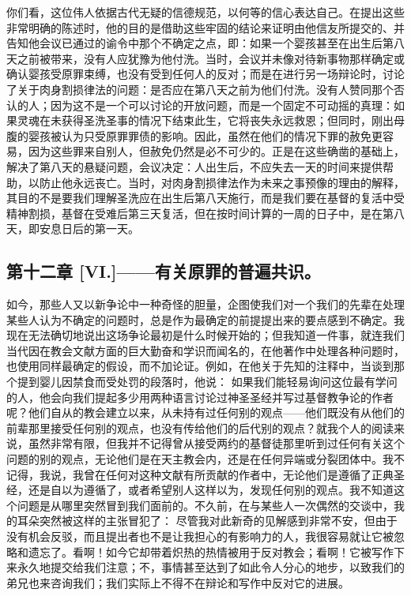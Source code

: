 你们看，这位伟人依据古代无疑的信德规范，以何等的信心表达自己。在提出这些非常明确的陈述时，他的目的是借助这些牢固的结论来证明由他信友所提交的、并告知他会议已通过的谕令中那个不确定之点，即：如果一个婴孩甚至在出生后第八天之前被带来，没有人应犹豫为他付洗。当时，会议并未像对待新事物那样确定或确认婴孩受原罪束缚，也没有受到任何人的反对；而是在进行另一场辩论时，讨论了关于肉身割损律法的问题：是否应在第八天之前为他们付洗。没有人赞同那个否认的人；因为这不是一个可以讨论的开放问题，而是一个固定不可动摇的真理：如果灵魂在未获得圣洗圣事的情况下结束此生，它将丧失永远救恩；但同时，刚出母腹的婴孩被认为只受原罪罪债的影响。因此，虽然在他们的情况下罪的赦免更容易，因为这些罪来自别人，但赦免仍然是必不可少的。正是在这些确凿的基础上，解决了第八天的悬疑问题，会议决定：人出生后，不应失去一天的时间来提供帮助，以防止他永远丧亡。当时，对肉身割损律法作为未来之事预像的理由的解释，其目的不是要我们理解圣洗应在出生后第八天施行，而是我们要在基督的复活中受精神割损，基督在受难后第三天复活，但在按时间计算的一周的日子中，是在第八天，即安息日后的第一天。\par


\subsection{第十二章 [VI.]——有关原罪的普遍共识。}

如今，那些人又以新争论中一种奇怪的胆量，企图使我们对一个我们的先辈在处理某些人认为不确定的问题时，总是作为最确定的前提提出来的要点感到不确定。我现在无法确切地说出这场争论最初是什么时候开始的；但我知道一件事，就连我们当代因在教会文献方面的巨大勤奋和学识而闻名的，在他著作中处理各种问题时，也使用同样最确定的假设，而不加论证。例如，在他关于先知的注释中，当谈到那个提到婴儿因禁食而受处罚的段落时，他说： 如果我们能轻易询问这位最有学问的人，他会向我们提起多少用两种语言讨论过神圣圣经并写过基督教争论的作者呢？他们自从的教会建立以来，从未持有过任何别的观点——他们既没有从他们的前辈那里接受任何别的观点，也没有传给他们的后代别的观点？就我个人的阅读来说，虽然非常有限，但我并不记得曾从接受两约的基督徒那里听到过任何有关这个问题的别的观点，无论他们是在天主教会内，还是在任何异端或分裂团体中。我不记得，我说，我曾在任何对这种文献有所贡献的作者中，无论他们是遵循了正典圣经，还是自以为遵循了，或者希望别人这样以为，发现任何别的观点。我不知道这个问题是从哪里突然冒到我们面前的。不久前，在与某些人一次偶然的交谈中，我的耳朵突然被这样的主张冒犯了： 尽管我对此新奇的见解感到非常不安，但由于没有机会反驳，而且提出者也不是让我担心的有影响力的人，我很容易就让它被忽略和遗忘了。看啊！如今它却带着炽热的热情被用于反对教会；看啊！它被写作下来永久地提交给我们注意；不，事情甚至达到了如此令人分心的地步，以致我们的弟兄也来咨询我们；我们实际上不得不在辩论和写作中反对它的进展。\par

